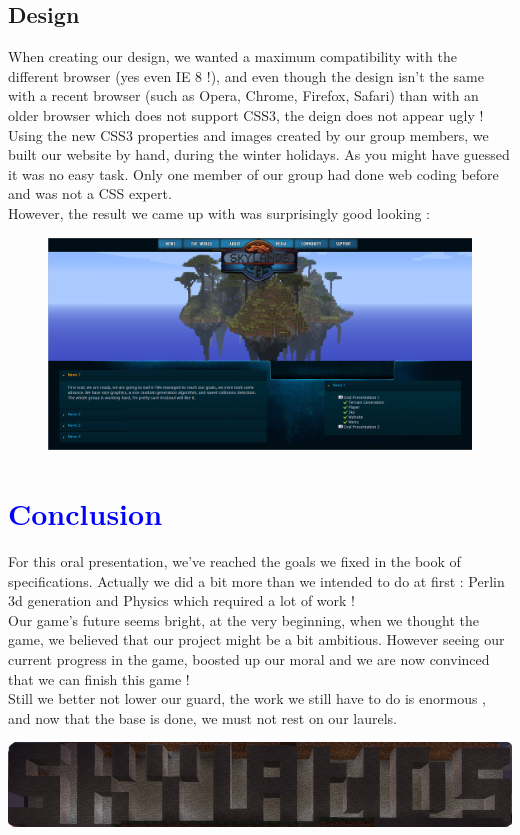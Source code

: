 \documentclass[article]{report} %
\begin{document}
				\section{Design}
					When creating our design, we wanted a maximum compatibility with the different browser (yes even IE 8 !), and even though the design isn't the same with a recent browser (such as Opera, Chrome, Firefox, Safari) than with an older browser which does not support CSS3, the deign does not appear ugly ! \\

					Using the new CSS3 properties and images created by our group members, we built our website by hand, during the winter holidays. As you might have guessed it was no easy task. Only one member of our group had done web coding before and was not a CSS expert.\\

					However, the result we came up with was surprisingly good looking : 
 
				\begin{figure}[h]
					\includegraphics[scale=0.34]{Images/website.png}
				\end{figure}

		\chapter{\textcolor{blue}{Conclusion}}
			For this oral presentation, we've reached the goals we fixed in the book of specifications. Actually we did a bit more than we intended to do at first : Perlin 3d generation and Physics which required a lot of work !\\
			
			Our game's future seems bright, at the very beginning, when we thought the game,  we believed that our project might be a bit ambitious. However seeing our current progress in the game,  boosted up our moral and we are now convinced that we can finish this game !\\

			Still we better not lower our guard, the work we still have to do is enormous , and now that the base is done, we must not rest on our laurels.
			
				\begin{center}
					\includegraphics[width=16cm]{Images/Skylands_logo.png}
				\end{center}     	     		
\end{document}
